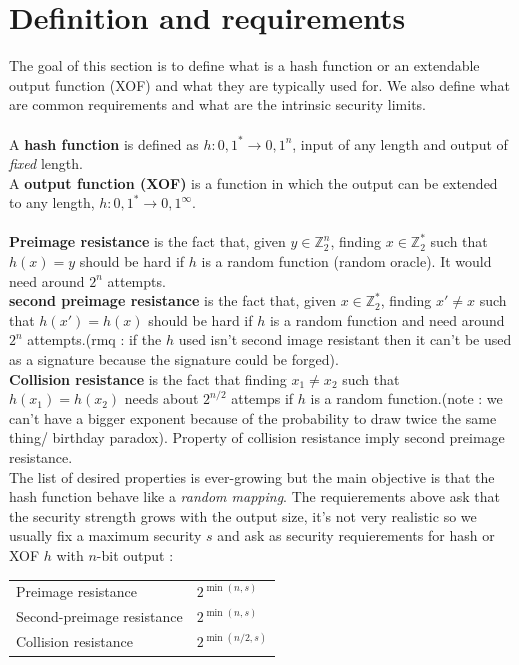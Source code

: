 \documentclass[11pt,a4paper]{report}
\begin{document}
\section{Definition and requirements}
The goal of this section is to define what is a hash function or an extendable output function (XOF) and what they are typically used for. We also define what are common requirements and what are the intrinsic security limits.\\
\\
A \textbf{hash function} is defined as $h : {0,1}^* \rightarrow {0,1}^n$, input of any length and output of \emph{fixed} length.\\
A \textbf{output function (XOF)} is a function in which the output can be extended to any length, $h : {0,1}^* \rightarrow {0,1}^{\infty}$.\\
\\
\textbf{Preimage resistance} is the fact that, given $y\in \mathbb{Z}_2^n$, finding $x\in \mathbb{Z}_2^*$ such that $h(x) = y$ should be hard if $h$ is a random function (random oracle). It would need around $2^n$ attempts. \\
\textbf{second preimage resistance} is the fact that, given $x\in \mathbb{Z}_2^*$, finding $x' \neq x$ such that $h(x') = h(x)$ should be hard if $h$ is a random function and need around $2^n$ attempts.(rmq : if the $h$ used isn't second image resistant then it can't be used as a signature because the signature could be forged).\\
\textbf{Collision resistance} is the fact that finding $x_1 \neq x_2$ such that $h(x_1) = h(x_2)$ needs about $2^{n/2}$ attemps if $h$ is a random function.(note : we can't have a bigger exponent because of the probability to draw twice the same thing/ birthday paradox). Property of collision resistance imply second preimage resistance.\\

The list of desired properties is ever-growing but the main objective is that the hash function behave like a \emph{random mapping}.
The requierements above ask that the security strength grows with the output size, it's not very realistic so we usually fix a maximum security $s$ and ask as security requierements for hash or XOF $h$ with $n$-bit output :
\begin{tabular}{|l|l|}
\hline
Preimage resistance & $2^{\min (n,s)}$ \\
Second-preimage resistance & $2^{\min (n,s)}$ \\
Collision resistance & $2^{\min (n/2,s)}$ \\
\hline
\end{tabular}
\end{document}
